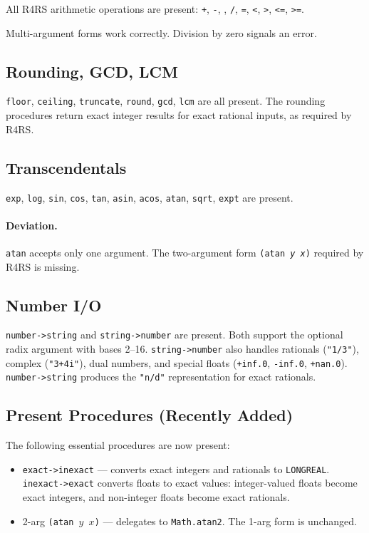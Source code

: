 \documentclass[12pt]{report}
\begin{document}
All R4RS arithmetic operations are present: {\tt +}, {\tt -}, {\tt *},
{\tt /}, {\tt =}, {\tt <}, {\tt >}, {\tt <=}, {\tt >=}.

Multi-argument forms work correctly.  Division by zero
signals an error.

\subsection{Rounding, GCD, LCM}

{\tt floor}, {\tt ceiling}, {\tt truncate}, {\tt round},
{\tt gcd}, {\tt lcm} are all present.  The rounding procedures
return exact integer results for exact rational inputs, as
required by R4RS.

\subsection{Transcendentals}

{\tt exp}, {\tt log}, {\tt sin}, {\tt cos}, {\tt tan}, {\tt asin},
{\tt acos}, {\tt atan}, {\tt sqrt}, {\tt expt} are present.

\paragraph{Deviation.}
{\tt atan} accepts only one argument.  The two-argument form
{\tt (atan \emph{y} \emph{x})} required by R4RS is missing.

\subsection{Number I/O}

{\tt number->string} and {\tt string->number} are present.  Both
support the optional radix argument with bases 2--16.
{\tt string->number} also handles rationals ({\tt "1/3"}), complex
({\tt "3+4i"}), dual numbers, and special floats ({\tt +inf.0},
{\tt -inf.0}, {\tt +nan.0}).  {\tt number->string} produces the
{\tt "n/d"} representation for exact rationals.

\subsection{Present Procedures (Recently Added)}

The following essential procedures are now present:
\begin{itemize}[nosep]
\item {\tt exact->inexact} --- converts exact integers and rationals
  to {\tt LONGREAL}.  {\tt inexact->exact} converts floats to exact
  values: integer-valued floats become exact integers, and non-integer
  floats become exact rationals.
\item 2-arg {\tt (atan $y$ $x$)} --- delegates to {\tt Math.atan2}.
  The 1-arg form is unchanged.
\end{itemize}
\end{document}
